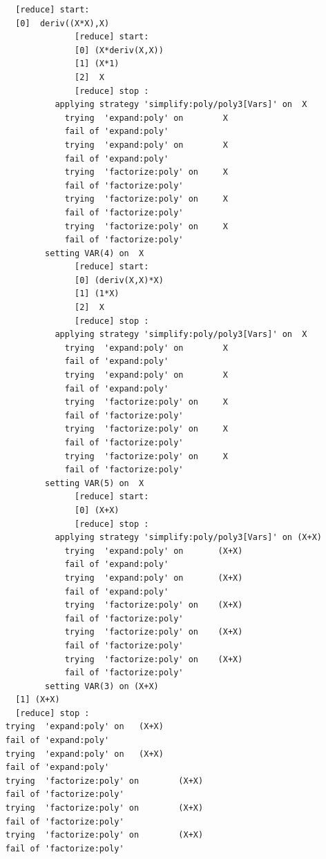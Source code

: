 \begin{description}
{\begin{verbatim}
       [reduce] start:
       [0]  deriv((X*X),X)
                   [reduce] start:
                   [0] (X*deriv(X,X))
                   [1] (X*1)
                   [2]  X
                   [reduce] stop :
               applying strategy 'simplify:poly/poly3[Vars]' on  X
                 trying  'expand:poly' on        X
                 fail of 'expand:poly' 
                 trying  'expand:poly' on        X
                 fail of 'expand:poly' 
                 trying  'factorize:poly' on     X
                 fail of 'factorize:poly' 
                 trying  'factorize:poly' on     X
                 fail of 'factorize:poly' 
                 trying  'factorize:poly' on     X
                 fail of 'factorize:poly' 
             setting VAR(4) on  X
                   [reduce] start:
                   [0] (deriv(X,X)*X)
                   [1] (1*X)
                   [2]  X
                   [reduce] stop :
               applying strategy 'simplify:poly/poly3[Vars]' on  X
                 trying  'expand:poly' on        X
                 fail of 'expand:poly' 
                 trying  'expand:poly' on        X
                 fail of 'expand:poly' 
                 trying  'factorize:poly' on     X
                 fail of 'factorize:poly' 
                 trying  'factorize:poly' on     X
                 fail of 'factorize:poly' 
                 trying  'factorize:poly' on     X
                 fail of 'factorize:poly' 
             setting VAR(5) on  X
                   [reduce] start:
                   [0] (X+X)
                   [reduce] stop :
               applying strategy 'simplify:poly/poly3[Vars]' on (X+X)
                 trying  'expand:poly' on       (X+X)
                 fail of 'expand:poly' 
                 trying  'expand:poly' on       (X+X)
                 fail of 'expand:poly' 
                 trying  'factorize:poly' on    (X+X)
                 fail of 'factorize:poly' 
                 trying  'factorize:poly' on    (X+X)
                 fail of 'factorize:poly' 
                 trying  'factorize:poly' on    (X+X)
                 fail of 'factorize:poly' 
             setting VAR(3) on (X+X)
       [1] (X+X)
       [reduce] stop :
     trying  'expand:poly' on   (X+X)
     fail of 'expand:poly' 
     trying  'expand:poly' on   (X+X)
     fail of 'expand:poly' 
     trying  'factorize:poly' on        (X+X)
     fail of 'factorize:poly' 
     trying  'factorize:poly' on        (X+X)
     fail of 'factorize:poly' 
     trying  'factorize:poly' on        (X+X)
     fail of 'factorize:poly' 


\end{verbatim}}
\end{description}
